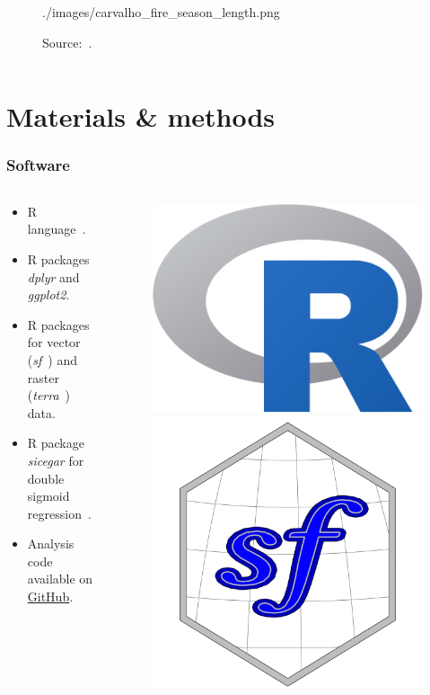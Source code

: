 \documentclass[aspectratio=169]{beamer}
\begin{document}
\begin{frame}
\begin{columns}
\begin{column}{0.5\linewidth}
\begin{figure}[h]
                {./images/carvalho_fire_season_length.png}
                \caption{Source:~\cite{carvalho2021}.}
            \end{figure}
        \end{column}
    \end{columns}
\end{frame}

\section{Materials \& methods}

\begin{frame}
    \frametitle{Software}
    \begin{columns}
        \begin{column}{0.5\linewidth}
            \begin{itemize}
                \item R language~\cite{ihaka1996}.
                \item R packages \textit{dplyr} and \textit{ggplot2}.
                \item R packages for vector (\textit{sf}~\cite{pebesma2018})
                    and raster (\textit{terra}~\cite{hijmans2020}) data.
                \item R package \textit{sicegar} for double sigmoid
                    regression~\cite{caglar2018}.
                \item Analysis code available on
                    \href{https://github.com/albhasan/seasonmetrics}{GitHub}.
            \end{itemize}
        \end{column}
        \begin{column}{0.5\linewidth}
            \begin{figure}[h]
                \includegraphics[width=0.35\linewidth]{./logos/Rlogo.png}
                \includegraphics[width=0.29\linewidth]{./logos/sf_logo.png}

\end{figure}
\end{column}
\end{columns}
\end{frame}
\end{document}
